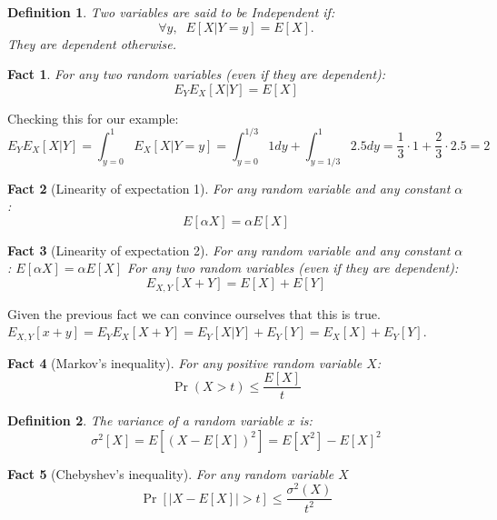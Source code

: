 \documentclass{article}
\newtheorem{definition}{Definition}[section]
\newtheorem{fact}{Fact}[section]
\begin{document}
\begin{definition}
Two variables are said to be {\it Independent} if:
\[
\forall y,\;\;E[ X | Y = y] = E[X].
\]
They are {\it dependent} otherwise.
\end{definition}


\begin{fact}
For any two random variables (even if they are dependent):
\begin{equation}
E_{Y}E_{X}[ X | Y] = E[X]
\end{equation}
\end{fact}
Checking this for our example:
\begin{equation}
E_{Y}E_{X} [ X | Y] = \int_{y=0}^{1} E_{X}[X|Y = y] =
\int_{y=0}^{1/3}1dy + \int_{y=1/3}^{1}2.5dy = \frac{1}{3} \cdot 1 +
\frac{2}{3}\cdot 2.5 = 2
\end{equation}

\begin{fact}[Linearity of expectation 1]%
For any random variable and any constant $\alpha$:
$$E[\alpha X] = \alpha E[X]$$
\end{fact}

\begin{fact}[Linearity of expectation 2]%
For any random variable and any constant $\alpha$:
$E[\alpha X] = \alpha E[X]$
For any two random variables (even if they are dependent):
\begin{equation}
E_{X,Y}[X+Y] = E[X] + E[Y]
\end{equation}
\end{fact}
Given the previous fact we can convince ourselves that this is true.
$E_{X,Y}[x+y] = E_{Y}E_{X}[X+Y] = E_{Y} [X|Y] + E_{Y} [Y] = E_X[X] +
E_Y[Y]$.

\begin{fact}[Markov's inequality]%
For any {\it positive} random variable $X$:
\begin{equation}
\Pr(X > t) \le \frac{E[X]}{t}
\end{equation}
\end{fact}


\begin{definition}
The variance of a random variable $x$ is:
\begin{equation}
\sigma^2[X] = E[(X-E[X])^2] = E[X^2] - E[X]^2
\end{equation}
\end{definition}

\begin{fact}[Chebyshev's inequality]%
For any random variable $X$
\begin{equation}
\Pr[|X-E[X]| > t] \le \frac{\sigma^2(X)}{t^2}
\end{equation}
\end{fact}
\end{document}
